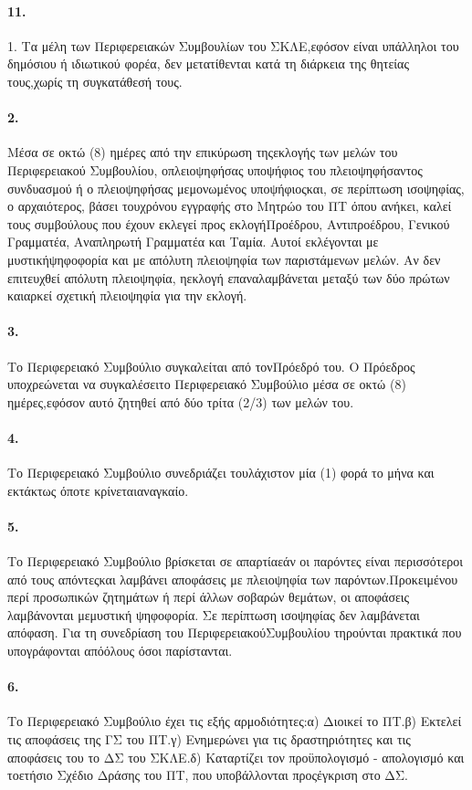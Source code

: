 \documentclass[a4paper,oneside, 10pt]{book}
\begin{document}
\paragraph { 11. } 1. Τα μέλη των Περιφερειακών Συμβουλίων του ΣΚΛΕ,εφόσον είναι υπάλληλοι του δημόσιου ή ιδιωτικού φορέα, δεν μετατίθενται κατά τη διάρκεια της θητείας τους,χωρίς τη συγκατάθεσή τους.
\paragraph { 2. } Μέσα σε οκτώ (8) ημέρες από την επικύρωση τηςεκλογής των μελών του Περιφερειακού Συμβουλίου, οπλειοψηφήσας υποψήφιος του πλειοψηφήσαντος συνδυασμού ή ο πλειοψηφήσας μεμονωμένος υποψήφιοςκαι, σε περίπτωση ισοψηφίας, ο αρχαιότερος, βάσει τουχρόνου εγγραφής στο Μητρώο του ΠΤ όπου ανήκει, καλεί τους συμβούλους που έχουν εκλεγεί προς εκλογήΠροέδρου, Αντιπροέδρου, Γενικού Γραμματέα, Αναπληρωτή Γραμματέα και Ταμία. Αυτοί εκλέγονται με μυστικήψηφοφορία και με απόλυτη πλειοψηφία των παριστάμενων μελών. Αν δεν επιτευχθεί απόλυτη πλειοψηφία, ηεκλογή επαναλαμβάνεται μεταξύ των δύο πρώτων καιαρκεί σχετική πλειοψηφία για την εκλογή.
\paragraph { 3. } Το Περιφερειακό Συμβούλιο συγκαλείται από τονΠρόεδρό του. Ο Πρόεδρος υποχρεώνεται να συγκαλέσειτο Περιφερειακό Συμβούλιο μέσα σε οκτώ (8) ημέρες,εφόσον αυτό ζητηθεί από δύο τρίτα (2/3) των μελών του.
\paragraph { 4. } Το Περιφερειακό Συμβούλιο συνεδριάζει τουλάχιστον μία (1) φορά το μήνα και εκτάκτως όποτε κρίνεταιαναγκαίο.
\paragraph { 5. } Το Περιφερειακό Συμβούλιο βρίσκεται σε απαρτίαεάν οι παρόντες είναι περισσότεροι από τους απόντεςκαι λαμβάνει αποφάσεις με πλειοψηφία των παρόντων.Προκειμένου περί προσωπικών ζητημάτων ή περί άλλων σοβαρών θεμάτων, οι αποφάσεις λαμβάνονται μεμυστική ψηφοφορία. Σε περίπτωση ισοψηφίας δεν λαμβάνεται απόφαση. Για τη συνεδρίαση του ΠεριφερειακούΣυμβουλίου τηρούνται πρακτικά που υπογράφονται απόόλους όσοι παρίστανται.
\paragraph { 6. } Το Περιφερειακό Συμβούλιο έχει τις εξής αρμοδιότητες:α) Διοικεί το ΠΤ.β) Εκτελεί τις αποφάσεις της ΓΣ του ΠΤ.γ) Ενημερώνει για τις δραστηριότητες και τις αποφάσεις του το ΔΣ του ΣΚΛΕ.δ) Καταρτίζει τον προϋπολογισμό - απολογισμό και τοετήσιο Σχέδιο Δράσης του ΠΤ, που υποβάλλονται προςέγκριση στο ΔΣ.
\end{document}
